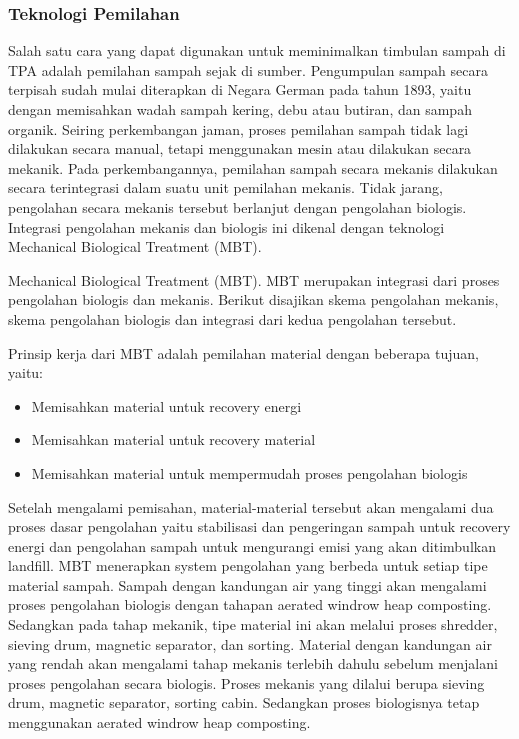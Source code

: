 \documentclass[../wastek.tex]{subfiles}
\begin{document}
\subsubsection{Teknologi Pemilahan}%
\label{ssub:teknologi_pemilahan}

Salah satu cara yang dapat digunakan untuk meminimalkan timbulan sampah di TPA adalah pemilahan sampah sejak di sumber. Pengumpulan sampah secara terpisah sudah mulai diterapkan di Negara German pada tahun 1893, yaitu dengan memisahkan wadah sampah kering, debu atau butiran, dan sampah organik.
Seiring perkembangan jaman, proses pemilahan sampah tidak lagi dilakukan secara manual, tetapi menggunakan mesin atau dilakukan secara mekanik.
Pada perkembangannya, pemilahan sampah secara mekanis dilakukan secara terintegrasi dalam suatu unit pemilahan mekanis. Tidak jarang, pengolahan secara mekanis tersebut berlanjut dengan pengolahan biologis. Integrasi pengolahan mekanis dan biologis ini dikenal dengan teknologi Mechanical Biological Treatment (MBT).

Mechanical Biological Treatment (MBT).
MBT merupakan integrasi dari proses pengolahan biologis dan mekanis. Berikut disajikan skema pengolahan mekanis, skema pengolahan biologis dan integrasi dari kedua pengolahan tersebut.


Prinsip kerja dari MBT adalah pemilahan material dengan beberapa tujuan, yaitu:
\begin{itemize}
	\item Memisahkan material untuk recovery energi
	\item Memisahkan material untuk recovery material
	\item Memisahkan material untuk mempermudah proses pengolahan biologis
\end{itemize}

Setelah mengalami pemisahan, material-material tersebut akan mengalami dua proses dasar pengolahan yaitu stabilisasi dan pengeringan sampah untuk recovery energi dan pengolahan sampah untuk mengurangi emisi yang akan ditimbulkan landfill. MBT menerapkan system pengolahan yang berbeda untuk setiap tipe material sampah. Sampah dengan kandungan air yang tinggi akan mengalami proses pengolahan biologis dengan tahapan aerated windrow heap composting. Sedangkan pada tahap mekanik, tipe material ini akan melalui proses shredder, sieving drum, magnetic separator, dan sorting. Material dengan kandungan air yang rendah akan mengalami tahap mekanis terlebih dahulu sebelum menjalani proses pengolahan secara biologis. Proses mekanis yang dilalui berupa sieving drum, magnetic separator, sorting cabin. Sedangkan proses biologisnya tetap menggunakan aerated windrow heap composting.
\end{document}
